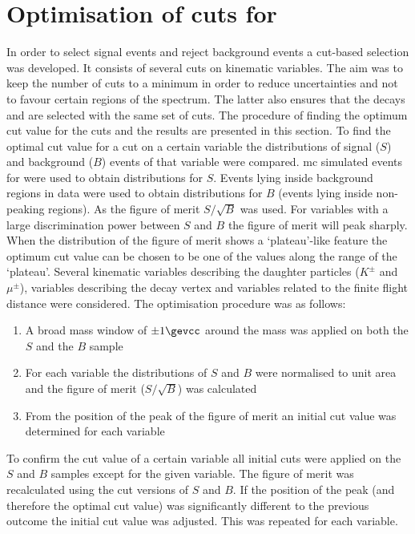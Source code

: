 \appendix

\doublepage
\chapter{Optimisation of cuts for \boldmath\bsphimumu\unboldmath}
\label{appendix:optimisation} 
In order to select \bsphimumu signal events and reject background events a cut-based selection was developed. It consists of several cuts on kinematic variables. The aim was to keep the number of cuts to a minimum in order to reduce uncertainties and not to favour certain regions of the \qs spectrum. The latter also ensures that the decays \bsjpsiphi and \bspsiprimephi are selected with the same set of cuts. The procedure of finding the optimum cut value for the cuts and the results are presented in this section. 
\newline To find the optimal cut value for a cut on a certain variable the distributions of signal ($S$) and background ($B$) events of that variable were compared. \ac{mc} simulated events for \bsphimumu were used to obtain distributions for $S$. Events lying inside background regions in data were used to obtain distributions for $B$ (\eg events lying inside non-peaking regions). As the figure of merit $S/\sqrt{B}$ was used. For variables with a large discrimination power between $S$ and $B$ the figure of merit will peak sharply. When the distribution of the figure of merit shows a `plateau'-like feature the optimum cut value can be chosen to be one of the values along the range of the `plateau'. 
\newline Several kinematic variables describing the daughter particles ($K^{\pm}$ and $\mu^{\pm}$), variables describing the \Bs decay vertex and variables related to the finite \Bs flight distance were considered. The optimisation procedure was as follows: 
\begin{enumerate}
\item A broad mass window of $\pm1\gevcc$ around the \Bs mass was applied on both the $S$ and the $B$ sample
\item For each variable the distributions of $S$ and $B$ were normalised to unit area and the figure of merit ($S/\sqrt{B}$) was calculated
\item From the position of the peak of the figure of merit an initial cut value was determined for each variable
\end{enumerate}
To confirm the cut value of a certain variable all initial cuts were applied on the $S$ and $B$ samples except for the given variable. The figure of merit was recalculated using the cut versions of $S$ and $B$. If the position of the peak (and therefore the optimal cut value) was significantly different to the previous outcome the initial cut value was adjusted. This was repeated for each variable. 
